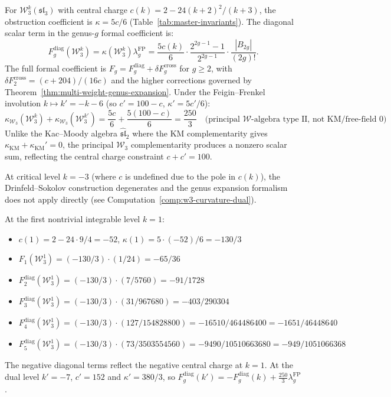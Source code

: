 \begin{computation}\label{comp:w3-genus-expansion}

For $\mathcal{W}_3^k(\mathfrak{sl}_3)$ with central charge
$c(k) = 2 - 24(k+2)^2/(k+3)$, the obstruction coefficient is
$\kappa = 5c/6$ (Table~\ref{tab:master-invariants}). The diagonal
scalar term in the genus-$g$ formal coefficient is:
\begin{equation}\label{eq:w3-Fg}
F_g^{\mathrm{diag}}(\mathcal{W}_3^k)
= \kappa(\mathcal{W}_3^k)\lambda_g^{\mathrm{FP}}
= \frac{5c(k)}{6} \cdot
\frac{2^{2g-1}-1}{2^{2g-1}} \cdot
\frac{|B_{2g}|}{(2g)!}.
\end{equation}
The full formal coefficient is
$F_g=F_g^{\mathrm{diag}}+\delta F_g^{\mathrm{cross}}$ for
$g\geq 2$, with $\delta F_2^{\mathrm{cross}}=(c+204)/(16c)$
and the higher corrections governed by
Theorem~\ref{thm:multi-weight-genus-expansion}.
Under the Feigin--Frenkel involution $k \mapsto k' = -k-6$ (so $c' = 100 - c$, $\kappa' = 5c'/6$):
\[
\kappa_{\mathcal{W}_3}(\mathcal{W}_3^k) + \kappa_{\mathcal{W}_3}(\mathcal{W}_3^{k'}) = \frac{5c}{6} + \frac{5(100-c)}{6} = \frac{250}{3} \quad \text{(principal $\mathcal{W}$-algebra type~II, not KM/free-field~$0$)}
\]
Unlike the Kac--Moody algebra $\widehat{\mathfrak{sl}}_2$ where
the KM complementarity gives
$\kappa_{\mathrm{KM}}+\kappa_{\mathrm{KM}}'=0$, the principal
$\mathcal{W}_3$ complementarity produces a nonzero scalar sum,
reflecting the central charge constraint $c+c'=100$.

At critical level $k = -3$ (where $c$ is undefined due to the pole in $c(k)$), the Drinfeld--Sokolov construction degenerates and the genus expansion formalism does not apply directly (see Computation~\ref{comp:w3-curvature-dual}).

\medskip
\noindent
At the first nontrivial integrable level $k = 1$:
\begin{itemize}
\item $c(1) = 2 - 24 \cdot 9/4 = -52$, \quad $\kappa(1) = 5 \cdot (-52)/6 = -130/3$
\item $F_1(\mathcal{W}_3^1) = (-130/3) \cdot (1/24) = -65/36$
\item $F_2^{\mathrm{diag}}(\mathcal{W}_3^1) = (-130/3) \cdot (7/5760) = -91/1728$
\item $F_3^{\mathrm{diag}}(\mathcal{W}_3^1) = (-130/3) \cdot (31/967680) = -403/290304$
\item $F_4^{\mathrm{diag}}(\mathcal{W}_3^1) = (-130/3) \cdot (127/154828800) = -16510/464486400 = -1651/46448640$
\item $F_5^{\mathrm{diag}}(\mathcal{W}_3^1) = (-130/3) \cdot (73/3503554560) = -9490/10510663680 = -949/1051066368$
\end{itemize}
The negative diagonal terms reflect the negative central charge at
$k=1$. At the dual level $k'=-7$, $c'=152$ and
$\kappa'=380/3$, so
$F_g^{\mathrm{diag}}(k')=-F_g^{\mathrm{diag}}(k)
+ \frac{250}{3}\lambda_g^{\mathrm{FP}}$.
\end{computation}

